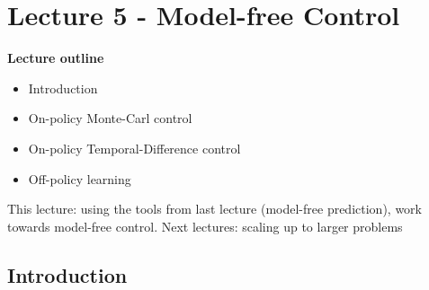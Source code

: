 \documentclass{article}
\begin{document}
\section{Lecture 5 - Model-free Control}

\textbf{Lecture outline}
\begin{itemize}
    \item Introduction
    \item On-policy Monte-Carl control
    \item On-policy Temporal-Difference control
    \item Off-policy learning
\end{itemize}

This lecture: using the tools from last lecture (model-free prediction), work towards model-free control. Next lectures: scaling up to larger problems

\subsection{Introduction}
\end{document}
